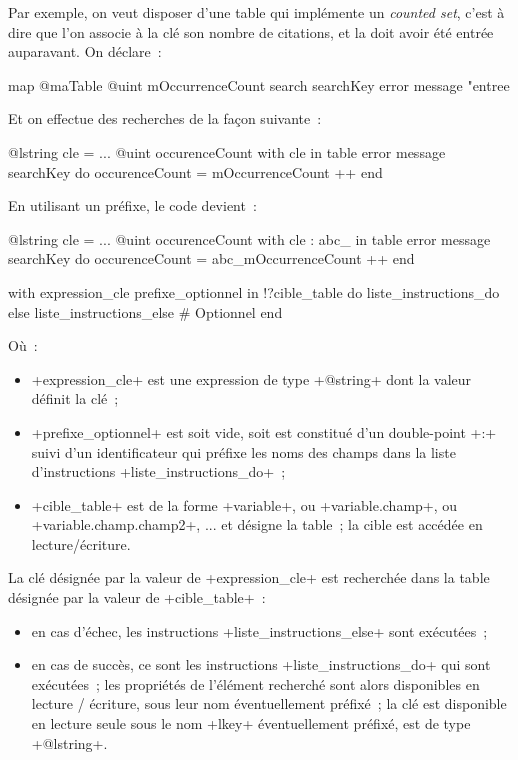 Par exemple, on veut disposer d'une table qui implémente un \emph{counted set}, c'est à dire que l'on associe à la clé son nombre de citations, et la doit avoir été entrée auparavant. On déclare~:
\begin{galgas}
map @maTable {
  @uint mOccurrenceCount
  search searchKey error message "entree %
}
\end{galgas}

Et on effectue des recherches de la façon suivante~:
\begin{galgas}
@lstring cle = ...
@uint occurenceCount
with cle in table error message searchKey do
  occurenceCount = mOccurrenceCount ++
end
\end{galgas}

En utilisant un préfixe, le code devient~:
\begin{galgas}
@lstring cle = ...
@uint occurenceCount
with cle : abc_ in table error message searchKey do
  occurenceCount = abc_mOccurrenceCount ++
end
\end{galgas}







\begin{galgas}
with expression_cle prefixe_optionnel in !?cible_table
do
  liste_instructions_do
else
  liste_instructions_else # Optionnel
end
\end{galgas}


Où~:
\begin{itemize}
  \item \ggs+expression_cle+ est une expression de type \ggs+@string+ dont la valeur définit la clé~;
  \item \ggs+prefixe_optionnel+ est soit vide, soit est constitué d'un double-point \ggs+:+ suivi d'un identificateur qui préfixe les noms des champs dans la liste d'instructions \ggs+liste_instructions_do+~;
  \item \ggs+cible_table+ est de la forme \ggs+variable+, ou  \ggs+variable.champ+, ou \ggs+variable.champ.champ2+, ... et désigne la table~; la cible est accédée en lecture/écriture.
\end{itemize}

La clé désignée par la valeur de \ggs+expression_cle+ est recherchée dans la table désignée par la valeur de \ggs+cible_table+~:
\begin{itemize}
  \item en cas d'échec, les instructions \ggs+liste_instructions_else+ sont exécutées~;
  \item en cas de succès, ce sont les instructions \ggs+liste_instructions_do+ qui sont exécutées~; les propriétés de l'élément recherché sont alors disponibles en lecture / écriture, sous leur nom éventuellement préfixé~; la clé est disponible en lecture seule sous le nom \ggs+lkey+ éventuellement préfixé, est de type \ggs+@lstring+.
\end{itemize}

